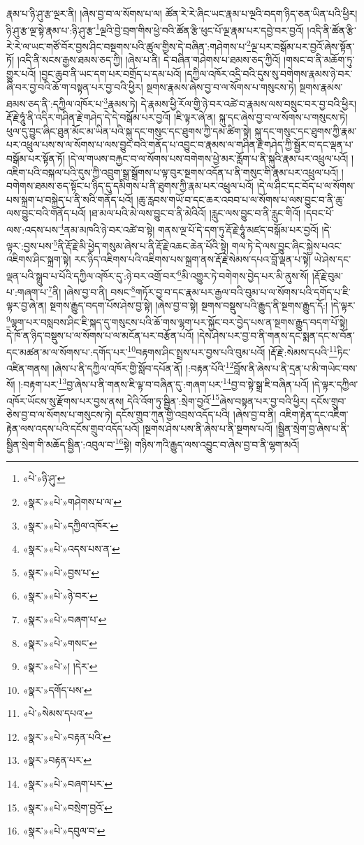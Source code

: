 རྣམ་པ་ཉི་ཤུ་རྩ་ལྔར་ནི། །ཞེས་བྱ་བ་ལ་སོགས་པ་ལ། ཚོན་རེ་རེ་ཞིང་ཡང་རྣམ་པ་ལྔའི་བདག་ཉིད་ཅན་ཡིན་པའི་ཕྱིར། ཉི་ཤུ་རྩ་ལྔ་སྟེ་རྣམ་པ་:ཉི་ཤུ་རྩ་\footnote{«པེ་»ཉི་ཤུ་}ལྔའི་བྱེ་བྲག་གིས་ཕྱེ་བའི་ཚོན་རྩི་ཕུང་པོ་ལྔ་རྣམ་པར་དབྱེ་བར་བྱའོ། །འདི་ནི་ཚོན་རྩི་རེ་རེ་ལ་ཡང་གཙོ་བོར་བྱས་ཤིང་བསྔགས་པའི་ཚུལ་གྱིས་དེ་བཞིན་:གཤེགས་པ་\footnote{«སྣར་»«པེ་»གཤེགས་པ་ལ་}ལྔ་པར་བསྒོམ་པར་བྱའོ་ཞེས་སྟོན་ཏོ། །འདི་ནི་སངས་རྒྱས་ཐམས་ཅད་ཀྱི། །ཞེས་པ་ནི། དེ་བཞིན་གཤེགས་པ་ཐམས་ཅད་ཀྱིའོ། །གསང་བ་ནི་མཆོག་ཏུ་གྱུར་པའོ། །བྱང་ཆུབ་ནི་ཡང་དག་པར་བགྲོད་པ་དམ་པའོ། །དཀྱིལ་འཁོར་འདྲི་བའི་དུས་སུ་བགེགས་རྣམས་ཉེ་བར་ཞི་བར་བྱ་བའི་ཆོ་ག་བསྟན་པར་བྱ་བའི་ཕྱིར། སྔགས་རྣམས་ཞེས་བྱ་བ་ལ་སོགས་པ་གསུངས་ཏེ། སྔགས་རྣམས་ཐམས་ཅད་ནི་:དཀྱིལ་འཁོར་པ་\footnote{«སྣར་»«པེ་»དཀྱིལ་འཁོར་}རྣམས་ཏེ། དེ་རྣམས་ཕྱི་རོལ་གྱི་ཉེ་བར་འཚེ་བ་རྣམས་ལས་བསྲུང་བར་བྱ་བའི་ཕྱིར། རྡོ་རྗེ་ཧཱུཾ་ནི་འདིར་གཤིན་རྗེ་གཤེད་དེ་དེ་བསྒོམ་པར་བྱའོ། །ཇི་ལྟར་ཞེ་ན། སྐུ་དང་ཞེས་བྱ་བ་ལ་སོགས་པ་གསུངས་ཏེ། ཕུལ་དུ་བྱུང་ཞིང་ཐུན་མོང་མ་ཡིན་པའི་སྐུ་དང་གསུང་དང་ཐུགས་ཀྱི་དམ་ཚིག་སྟེ། སྐུ་དང་གསུང་དང་ཐུགས་ཀྱི་རྣམ་པར་འཕྲུལ་པས་ས་ལ་སོགས་པ་ལས་བྱུང་བའི་གནོད་པ་འབྱུང་བ་རྣམས་ལ་གཤིན་རྗེ་གཤེད་ཀྱི་སྦྱོར་བ་དང་ལྡན་པ་བསྒོམ་པར་སྟོན་ཏོ། །དེ་ལ་གཡས་བརྐྱང་བ་ལ་སོགས་པས་བགེགས་ཕྱེ་མར་རློག་པ་ནི་སྐུའི་རྣམ་པར་འཕྲུལ་པའོ། །འཇིག་པའི་བསྐལ་པའི་དུས་ཀྱི་འབྲུག་སྒྲ་སྒྲོགས་པ་ལྟ་བུར་སྔགས་འདོན་པ་ནི་གསུང་གི་རྣམ་པར་འཕྲུལ་པའོ། །བགེགས་ཐམས་ཅད་སྟོང་པ་ཉིད་དུ་དམིགས་པ་ནི་ཐུགས་ཀྱི་རྣམ་པར་འཕྲུལ་པའོ། །དེ་ལ་ཤིང་དང་བོད་པ་ལ་སོགས་པས་སྐྲག་པ་བསྐྱེད་པ་ནི་སའི་གནོད་པའོ། །ཆུ་རླབས་གཡོ་བ་དང་ཆར་འབབ་པ་ལ་སོགས་པ་ལས་བྱུང་བ་ནི་ཆུ་ལས་བྱུང་བའི་གནོད་པའོ། །ཐ་མལ་པའི་མེ་ལས་བྱུང་བ་ནི་མེའིའོ། །རླུང་ལས་བྱུང་བ་ནི་རླུང་གིའོ། །དབང་པོ་ལས་:འདས་པས་\footnote{«སྣར་»«པེ་»འདས་པས་ན་}ནམ་མཁའི་ཉེ་བར་འཚེ་བ་སྟེ། གནས་ལྔ་པོ་དེ་དག་ཏུ་རྡོ་རྗེ་ཧཱུཾ་མཛད་བསྒོམ་པར་བྱའོ། །དེ་ལྟར་:བྱས་པས་\footnote{«སྣར་»«པེ་»བྱས་པ་}ནི་རྡོ་རྗེ་མི་ཕྱེད་གསུམ་ཞེས་པ་ནི་རྡོ་རྗེ་འཆང་ཆེན་པོའི་སྟེ། གལ་ཏེ་དེ་ལས་བྱུང་ཞིང་སྐྱེས་པའང་འཇིགས་ཤིང་སྐྲག་སྟེ། རང་ཉིད་འཇིགས་པའི་འཇིགས་པས་སྐྲག་ནས་རྡོ་རྗེ་སེམས་དཔའ་བློ་ལྡན་པ་སྟེ། ཡེ་ཤེས་དང་ལྡན་པའི་སྒྲུབ་པ་པོའི་དཀྱིལ་འཁོར་དུ་:ཉེ་བར་འགྲོ་བར་\footnote{«སྣར་»«པེ་»ཉེ་བར་}མི་འགྱུར་ཏེ་བགེགས་བྱེད་པར་མི་ནུས་སོ། །རྡོ་རྗེ་བུམ་པ་:གཞག་པ་\footnote{«སྣར་»«པེ་»བཞག་པ་}ནི། །ཞེས་བྱ་བ་ནི། བསང་\footnote{«སྣར་»«པེ་»གསང་}གཏོར་བྱ་བ་དང་རྣམ་པར་རྒྱལ་བའི་བུམ་པ་ལ་སོགས་པའི་དགོད་པ་ཇི་ལྟར་བྱ་ཞེ་ན། སྔགས་རྒྱུད་བདག་པོས་ཤེས་བྱ་སྟེ། །ཞེས་བྱ་བ་སྟེ། སྔགས་བསྡུས་པའི་རྒྱུད་ནི་སྔགས་རྒྱུད་དོ:། །དེ་ལྟར་\footnote{«སྣར་»«པེ་»། །དེར་}ལྷག་པར་བསླབས་ཤིང་ཇི་སྐད་དུ་གསུངས་པའི་ཆོ་གས་ལྷག་པར་སྐྱོང་བར་བྱེད་པས་ན་སྔགས་རྒྱུད་བདག་པོ་སྟེ། དེ་ཁོ་ན་ཉིད་བསྡུས་པ་ལ་སོགས་པ་ལ་མངོན་པར་བརྩོན་པའོ། །དེས་ཤེས་པར་བྱ་བ་ནི་གནས་དང་སྨན་དང་ས་བོན་དང་མཚན་མ་ལ་སོགས་པ་:དགོད་པར་\footnote{«སྣར་»དགོད་པས་}བརྟགས་ཤིང་སྤྲས་པར་བྱས་པའི་བུམ་པའོ། །རྡོ་རྗེ་:སེམས་དཔའི་\footnote{«པེ་»སེམས་དཔའ་}ཏིང་འཛིན་གནས། །ཞེས་པ་ནི་དཀྱིལ་འཁོར་གྱི་སློབ་དཔོན་ནོ། །:བརྟན་པོའི་\footnote{«སྣར་»«པེ་»བརྟན་པའི་}བློས་ནི་ཞེས་པ་ནི་དྲན་པ་མི་གཡེང་བས་སོ། །:བརྟག་པར་\footnote{«སྣར་»བརྟན་པར་}བྱ་ཞེས་པ་ནི་གནས་ཇི་ལྟ་བ་བཞིན་དུ་:གཞག་པར་\footnote{«སྣར་»«པེ་»བཞག་པར་}བྱ་བ་སྟེ་སྒྲ་ཇི་བཞིན་པའོ། །དེ་ལྟར་དཀྱིལ་འཁོར་ཡོངས་སུ་རྫོགས་པར་བྱས་ནས། དེའི་འོག་ཏུ་སྦྱིན་:སྲེག་བྱའོ་\footnote{«སྣར་»«པེ་»བསྲེག་བྱའོ་}ཞེས་བསྟན་པར་བྱ་བའི་ཕྱིར། དངོས་གྲུབ་ཅེས་བྱ་བ་ལ་སོགས་པ་གསུངས་ཏེ། དངོས་གྲུབ་ཀུན་གྱི་འབྲས་འདོད་པའི། །ཞེས་བྱ་བ་ནི། འཇིག་རྟེན་དང་འཇིག་རྟེན་ལས་འདས་པའི་དངོས་གྲུབ་འདོད་པའོ། །སྔགས་ཤེས་པས་ནི་ཞེས་པ་ནི་སྔགས་པའོ། །སྦྱིན་སྲེག་བྱ་ཞེས་པ་ནི་སྦྱིན་སྲེག་གི་མཆོད་སྦྱིན་:འབུལ་བ་\footnote{«སྣར་»«པེ་»དབུལ་བ་}སྟེ། གཉིས་ཀའི་རྒྱུད་ལས་འབྱུང་བ་ཞེས་བྱ་བ་ནི་ལྷག་མའོ། 